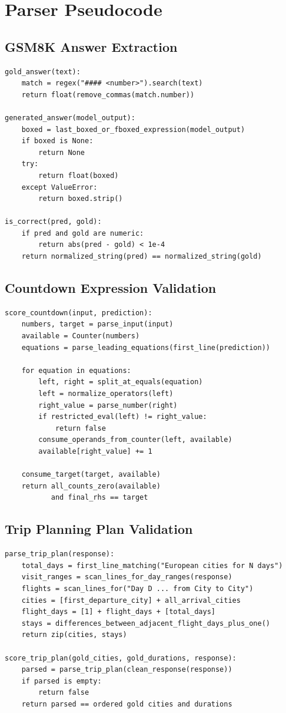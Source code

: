 \section{Parser Pseudocode}

\subsection{GSM8K Answer Extraction}
\begin{verbatim}
gold_answer(text):
    match = regex("#### <number>").search(text)
    return float(remove_commas(match.number))

generated_answer(model_output):
    boxed = last_boxed_or_fboxed_expression(model_output)
    if boxed is None:
        return None
    try:
        return float(boxed)
    except ValueError:
        return boxed.strip()

is_correct(pred, gold):
    if pred and gold are numeric:
        return abs(pred - gold) < 1e-4
    return normalized_string(pred) == normalized_string(gold)
\end{verbatim}

\subsection{Countdown Expression Validation}
\begin{verbatim}
score_countdown(input, prediction):
    numbers, target = parse_input(input)
    available = Counter(numbers)
    equations = parse_leading_equations(first_line(prediction))

    for equation in equations:
        left, right = split_at_equals(equation)
        left = normalize_operators(left)
        right_value = parse_number(right)
        if restricted_eval(left) != right_value:
            return false
        consume_operands_from_counter(left, available)
        available[right_value] += 1

    consume_target(target, available)
    return all_counts_zero(available)
           and final_rhs == target
\end{verbatim}

\subsection{Trip Planning Plan Validation}
\begin{verbatim}
parse_trip_plan(response):
    total_days = first_line_matching("European cities for N days")
    visit_ranges = scan_lines_for_day_ranges(response)
    flights = scan_lines_for("Day D ... from City to City")
    cities = [first_departure_city] + all_arrival_cities
    flight_days = [1] + flight_days + [total_days]
    stays = differences_between_adjacent_flight_days_plus_one()
    return zip(cities, stays)

score_trip_plan(gold_cities, gold_durations, response):
    parsed = parse_trip_plan(clean_response(response))
    if parsed is empty:
        return false
    return parsed == ordered gold cities and durations
\end{verbatim}
